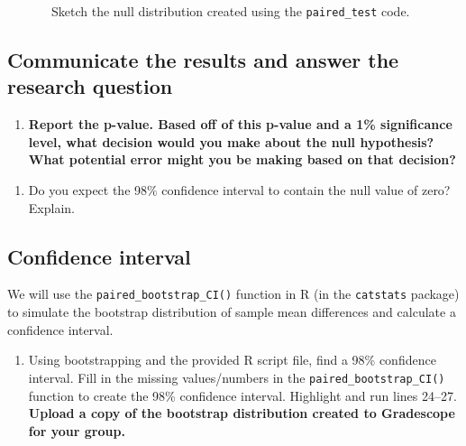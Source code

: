 \documentclass[
]{report}
\providecommand{\tightlist}{%
  \setlength{\itemsep}{0pt}\setlength{\parskip}{0pt}}
\begin{document}
~~~~~~~Sketch the null distribution created using the \texttt{paired\_test} code.

\vspace{1.5in}

\hypertarget{communicate-the-results-and-answer-the-research-question-3}{%
\subsection*{Communicate the results and answer the research question}\label{communicate-the-results-and-answer-the-research-question-3}}

\begin{enumerate}
\def\labelenumi{\arabic{enumi}.}
\setcounter{enumi}{12}
\tightlist
\item
  \textbf{Report the p-value. Based off of this p-value and a 1\% significance level, what decision would you make about the null hypothesis? What potential error might you be making based on that decision?}
\end{enumerate}

\vspace{0.5in}

\begin{enumerate}
\def\labelenumi{\arabic{enumi}.}
\setcounter{enumi}{13}
\tightlist
\item
  Do you expect the 98\% confidence interval to contain the null value of zero? Explain.
\end{enumerate}

\vspace{0.8in}

\hypertarget{confidence-interval-4}{%
\subsection*{Confidence interval}\label{confidence-interval-4}}

We will use the \texttt{paired\_bootstrap\_CI()} function in R (in the \texttt{catstats} package) to simulate the bootstrap distribution of sample mean differences and calculate a confidence interval.

\begin{enumerate}
\def\labelenumi{\arabic{enumi}.}
\setcounter{enumi}{14}
\tightlist
\item
  Using bootstrapping and the provided R script file, find a 98\% confidence interval. Fill in the missing values/numbers in the \texttt{paired\_bootstrap\_CI()} function to create the 98\% confidence interval. Highlight and run lines 24--27. \textbf{Upload a copy of the bootstrap distribution created to Gradescope for your group.}
\end{enumerate}
\end{document}
